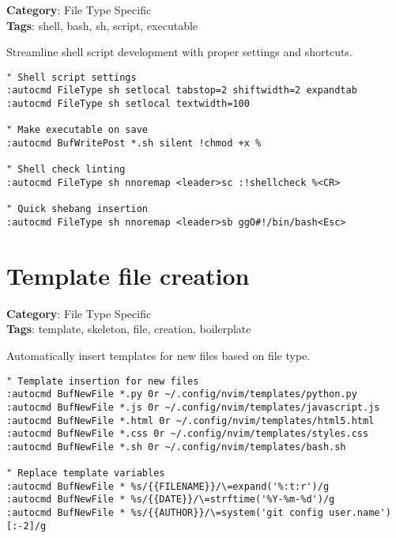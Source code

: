 {{{{{{\textbf{Category}: File Type Specific\\ \textbf{Tags}: shell, bash, sh, script, executable
\vspace{0.5cm}

Streamline shell script development with proper settings and shortcuts.

\begin{Exa*}{}
\begin{Verbatim}[fontsize=\footnotesize, breaklines, breakanywhere]
" Shell script settings
:autocmd FileType sh setlocal tabstop=2 shiftwidth=2 expandtab
:autocmd FileType sh setlocal textwidth=100

" Make executable on save
:autocmd BufWritePost *.sh silent !chmod +x %

" Shell check linting
:autocmd FileType sh nnoremap <leader>sc :!shellcheck %<CR>

" Quick shebang insertion
:autocmd FileType sh nnoremap <leader>sb ggO#!/bin/bash<Esc>
\end{Verbatim}
\end{Exa*}

\section{Template file creation}

\textbf{Category}: File Type Specific\\ \textbf{Tags}: template, skeleton, file, creation, boilerplate
\vspace{0.5cm}

Automatically insert templates for new files based on file type.

\begin{Exa*}{}
\begin{Verbatim}[fontsize=\footnotesize, breaklines, breakanywhere]
" Template insertion for new files
:autocmd BufNewFile *.py 0r ~/.config/nvim/templates/python.py
:autocmd BufNewFile *.js 0r ~/.config/nvim/templates/javascript.js
:autocmd BufNewFile *.html 0r ~/.config/nvim/templates/html5.html
:autocmd BufNewFile *.css 0r ~/.config/nvim/templates/styles.css
:autocmd BufNewFile *.sh 0r ~/.config/nvim/templates/bash.sh

" Replace template variables
:autocmd BufNewFile * %s/{{FILENAME}}/\=expand('%:t:r')/g
:autocmd BufNewFile * %s/{{DATE}}/\=strftime('%Y-%m-%d')/g
:autocmd BufNewFile * %s/{{AUTHOR}}/\=system('git config user.name')[:-2]/g
\end{Verbatim}
\end{Exa*}

}}}}}}
